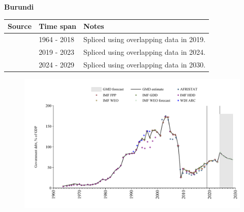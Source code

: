 \documentclass[12pt,a4paper,landscape]{article}
\begin{document}
\begin{adjustbox}{max totalsize={\paperwidth}{\paperheight},center}
\begin{minipage}[t][\textheight][t]{\textwidth}
\vspace*{0.5cm}
{}
\begin{center}
{\Large\bfseries Burundi}
\end{center}
\vspace{0.5cm}
\begin{table}[H]
\centering
\small
\begin{tabular}{|l|l|l|}
\hline
\textbf{Source} & \textbf{Time span} & \textbf{Notes} \\
\hline
\rowcolor{white}\cite{IMF_GDD}& 1964 - 2018 &Spliced using overlapping data in 2019.\\
\rowcolor{lightgray}\cite{IMF_FPP}& 2019 - 2023 &Spliced using overlapping data in 2024.\\
\rowcolor{white}\cite{IMF_WEO_forecast}& 2024 - 2029 &Spliced using overlapping data in 2030.\\
\hline
\end{tabular}
\end{table}
\begin{figure}[H]
\centering
\includegraphics[width=\textwidth,height=0.6\textheight,keepaspectratio]{graphs/BDI_govdebt_GDP.pdf}
\end{figure}
\end{minipage}
\end{adjustbox}
\end{document}
